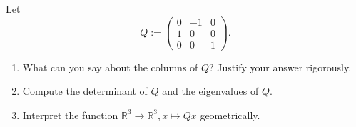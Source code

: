 %
Let $$Q := \begin{pmatrix}
0 &-1&0\\
1 & 0 &0\\
0 & 0 & 1
\end{pmatrix} .$$
\begin{enumerate}
	\item What can you say about the columns of $Q$? Justify your answer rigorously.
	\item Compute the determinant of $Q$ and the eigenvalues of $Q$.
	\item Interpret the function $\mathbb{R}^3 \to \mathbb{R}^3, x \mapsto Qx$ geometrically.
\end{enumerate}
